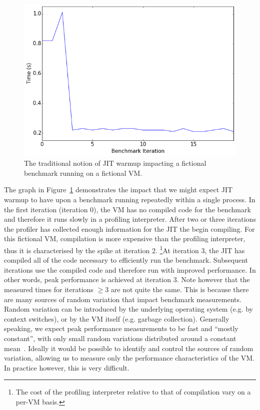 \documentclass[10pt,preprint]{sigplanconf}
\begin{document}
\begin{figure}[h!]
\centering
\includegraphics[width=.4\textwidth]{img/trad}
\caption{The traditional notion of JIT warmup impacting a fictional
benchmark running on a fictional VM.}
\label{fig:trad}
\end{figure}

The graph in Figure~\ref{fig:trad} demonstrates the impact that we might
expect JIT warmup to have upon a benchmark running repeatedly within a
single process. In the first iteration (iteration 0), the VM has no compiled
code for the benchmark and therefore it runs slowly in a profiling
interpreter. After two or three iterations the profiler has collected enough
information for the JIT the begin compiling. For this fictional VM,
compilation is more expensive than the profiling interpreter, thus it is
characterised by the spike at iteration 2. \footnote{The cost of
the profiling interpreter relative to that of compilation vary on a per-VM
basis.}At iteration 3, the JIT has compiled all of the code necessary to
efficiently run the benchmark. Subsequent iterations use the compiled code
and therefore run with improved performance. In other words, peak
performance is achieved at iteration 3. Note however that the measured times
for iterations $\geq 3$ are not quite the same. This is because there are many
sources of random variation that impact benchmark measurements. Random
variation can be introduced by the underlying operating system (e.g. by
context switches), or by the VM itself (e.g. garbage collection).  Generally
speaking, we expect peak performance measurements to be fast and ``mostly
constant'', with only small random variations distributed around a constant
mean~\cite{XXX}.  Ideally it would be possible to identify and control the
sources of random variation, allowing us to measure only the performance
characteristics of the VM. In practice however, this is very difficult.
\end{document}
